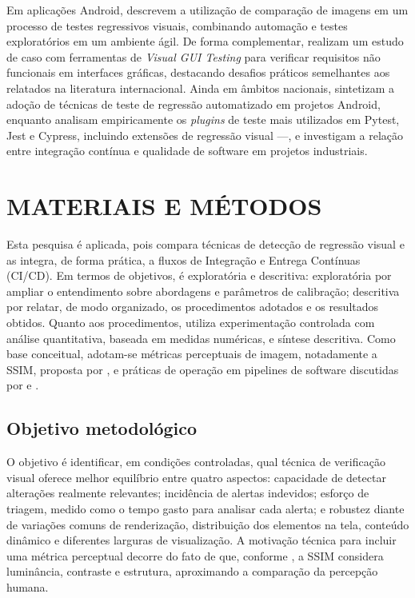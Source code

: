 \documentclass{UNESC}
\begin{document}
Em aplicações Android,  descrevem a utilização de comparação de imagens em um processo de testes regressivos visuais, combinando automação e testes exploratórios em um ambiente ágil. De forma complementar,  realizam um estudo de caso com ferramentas de \emph{Visual GUI Testing} para verificar requisitos não funcionais em interfaces gráficas, destacando desafios práticos semelhantes aos relatados na literatura internacional. Ainda em âmbitos nacionais,  sintetizam a adoção de técnicas de teste de regressão automatizado em projetos Android, enquanto  analisam empiricamente os \emph{plugins} de teste mais utilizados em Pytest, Jest e Cypress, incluindo extensões de regressão visual —, e  investigam a relação entre integração contínua e qualidade de software em projetos industriais.


\section{MATERIAIS E MÉTODOS}

Esta pesquisa é aplicada, pois compara técnicas de detecção de regressão visual e as integra, de forma prática, a fluxos de Integração e Entrega Contínuas (CI/CD). Em termos de objetivos, é exploratória e descritiva: exploratória por ampliar o entendimento sobre abordagens e parâmetros de calibração; descritiva por relatar, de modo organizado, os procedimentos adotados e os resultados obtidos. Quanto aos procedimentos, utiliza experimentação controlada com análise quantitativa, baseada em medidas numéricas, e síntese descritiva. Como base conceitual, adotam-se métricas perceptuais de imagem, notadamente a SSIM, proposta por , e práticas de operação em pipelines de software discutidas por  e .

\subsection{Objetivo metodológico}
O objetivo é identificar, em condições controladas, qual técnica de verificação visual oferece melhor equilíbrio entre quatro aspectos: capacidade de detectar alterações realmente relevantes; incidência de alertas indevidos; esforço de triagem, medido como o tempo gasto para analisar cada alerta; e robustez diante de variações comuns de renderização, distribuição dos elementos na tela, conteúdo dinâmico e diferentes larguras de visualização. A motivação técnica para incluir uma métrica perceptual decorre do fato de que, conforme , a SSIM considera luminância, contraste e estrutura, aproximando a comparação da percepção humana.
\end{document}
